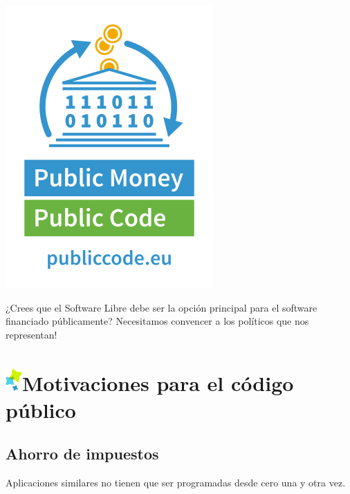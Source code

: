 \documentclass[10pt,foldmark,tumble]{leaflet}
\begin{document}
\includegraphics[scale=1.5]{pmpc.png}

\vspace{2em}

\begin{mdframed}[style=MyFrame]
\end{mdframed}

\vspace{2em}
¿Crees que el Software Libre debe ser la opción principal para el software financiado públicamente? Necesitamos convencer a los políticos que nos representan!

\vspace{3em}


\section{\includegraphics{item.png}Motivaciones para el código público}

\subsection{Ahorro de impuestos}

Aplicaciones similares no tienen que ser programadas desde cero una y otra vez.
\end{document}
